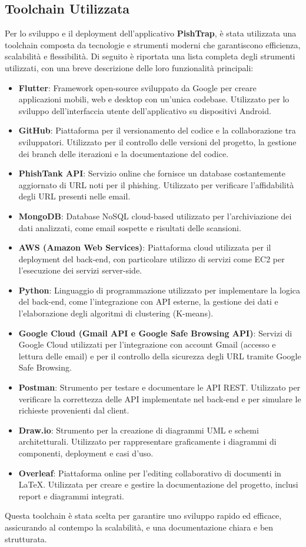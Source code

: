 \subsection{Toolchain Utilizzata}
Per lo sviluppo e il deployment dell'applicativo \textbf{PishTrap}, è stata utilizzata una toolchain composta da tecnologie e strumenti moderni che garantiscono efficienza, scalabilità e flessibilità. Di seguito è riportata una lista completa degli strumenti utilizzati, con una breve descrizione delle loro funzionalità principali:

\begin{itemize}
    \item \textbf{Flutter}: Framework open-source sviluppato da Google per creare applicazioni mobili, web e desktop con un'unica codebase. Utilizzato per lo sviluppo dell'interfaccia utente dell'applicativo su dispositivi Android.
    \item \textbf{GitHub}: Piattaforma per il versionamento del codice e la collaborazione tra sviluppatori. Utilizzato per il controllo delle versioni del progetto, la gestione dei branch delle iterazioni e la documentazione del codice.
    \item \textbf{PhishTank API}: Servizio online che fornisce un database costantemente aggiornato di URL noti per il phishing. Utilizzato per verificare l'affidabilità degli URL presenti nelle email.
    \item \textbf{MongoDB}: Database NoSQL cloud-based utilizzato per l'archiviazione dei dati analizzati, come email sospette e risultati delle scansioni.
    \item \textbf{AWS (Amazon Web Services)}: Piattaforma cloud utilizzata per il deployment del back-end, con particolare utilizzo di servizi come EC2 per l'esecuzione dei servizi server-side.
    \item \textbf{Python}: Linguaggio di programmazione utilizzato per implementare la logica del back-end, come l'integrazione con API esterne, la gestione dei dati e l'elaborazione degli algoritmi di clustering (K-means).
    \item \textbf{Google Cloud (Gmail API e Google Safe Browsing API)}: Servizi di Google Cloud utilizzati per l'integrazione con account Gmail (accesso e lettura delle email) e per il controllo della sicurezza degli URL tramite Google Safe Browsing.
    \item \textbf{Postman}: Strumento per testare e documentare le API REST. Utilizzato per verificare la correttezza delle API implementate nel back-end e per simulare le richieste provenienti dal client.
    \item \textbf{Draw.io}: Strumento per la creazione di diagrammi UML e schemi architetturali. Utilizzato per rappresentare graficamente i diagrammi di componenti, deployment e casi d'uso.
    \item \textbf{Overleaf}: Piattaforma online per l'editing collaborativo di documenti in LaTeX. Utilizzata per creare e gestire la documentazione del progetto, inclusi report e diagrammi integrati.
\end{itemize}

\noindent
Questa toolchain è stata scelta per garantire uno sviluppo rapido ed efficace, assicurando al contempo la scalabilità, e una documentazione chiara e ben strutturata.
